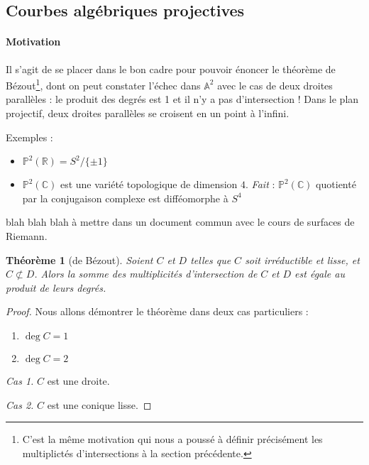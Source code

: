 \documentclass[a4paper, 11pt]{article}
\newtheorem{théorème}{Théorème}
\theoremstyle{definition}
\newcommand{\real}{\mathbb{R}}
\newcommand{\complex}{\mathbb{C}}
\newcommand{\aff}{\mathbb{A}}
\newcommand{\proj}{\mathbb{P}}
\begin{document}
\subsection{Courbes algébriques projectives}

\paragraph{Motivation} Il s'agit de se placer dans le bon cadre pour
pouvoir énoncer le théorème de Bézout\footnote{C'est la même
  motivation qui nous a poussé à définir précisément les multiplictés
  d'intersections à la section précédente.}, dont on peut constater
l'échec dans $\aff^2$ avec le cas de deux droites parallèles : le
produit des degrés est 1 et il n'y a pas d'intersection ! Dans le plan
projectif, deux droites parallèles se croisent en un point à l'infini.

Exemples :
\begin{itemize}
\item $\proj^2(\real) = S^2/\{\pm 1\}$
\item $\proj^2(\complex)$ est une variété topologique de dimension
  $4$. \textit{Fait} : $\proj^2(\complex)$ quotienté par la
  conjugaison complexe est difféomorphe à $S^4$ 
\end{itemize}

blah blah blah à mettre dans un document commun avec le cours de
surfaces de Riemann.

\begin{théorème}[de Bézout]
  Soient $C$ et $D$ telles que $C$ soit irréductible et lisse, et
  $C \not\subset D$. Alors la somme des multiplicités d'intersection
  de $C$ et $D$ est égale au produit de leurs degrés.
\end{théorème}
\begin{proof}
  Nous allons démontrer le théorème dans deux cas particuliers :
  \begin{enumerate}
  \item $\deg C = 1$
  \item $\deg C = 2$
  \end{enumerate}

\textit{Cas 1.} $C$ est une droite. 

\textit{Cas 2.} $C$ est une conique lisse.
\end{proof}
\end{document}
